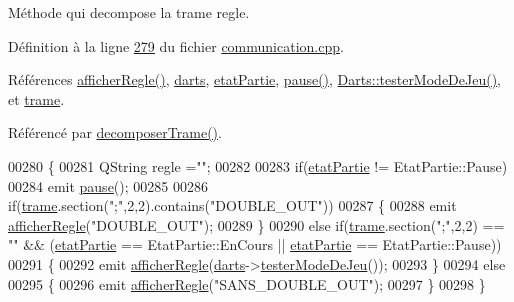 Méthode qui decompose la trame regle. 



Définition à la ligne \hyperlink{communication_8cpp_source_l00279}{279} du fichier \hyperlink{communication_8cpp_source}{communication.\+cpp}.



Références \hyperlink{class_communication_a4ee52f9b4a1a97967ab2c48a33e0e392}{afficher\+Regle()}, \hyperlink{communication_8h_source_l00093}{darts}, \hyperlink{communication_8h_source_l00100}{etat\+Partie}, \hyperlink{class_communication_a369c7aeadc5c5926eb701bdebe53972c}{pause()}, \hyperlink{darts_8cpp_source_l00506}{Darts\+::tester\+Mode\+De\+Jeu()}, et \hyperlink{communication_8h_source_l00099}{trame}.



Référencé par \hyperlink{communication_8cpp_source_l00188}{decomposer\+Trame()}.


\begin{DoxyCode}
00280 \{
00281     QString regle =\textcolor{stringliteral}{""};
00282 
00283     \textcolor{keywordflow}{if}(\hyperlink{class_communication_a2539ded2780db2c732690c585c768c96}{etatPartie} != EtatPartie::Pause)
00284         emit \hyperlink{class_communication_a369c7aeadc5c5926eb701bdebe53972c}{pause}();
00285 
00286     \textcolor{keywordflow}{if}(\hyperlink{class_communication_ac8f5004bfaaf7f538ba5ae93255f772b}{trame}.section(\textcolor{stringliteral}{";"},2,2).contains(\textcolor{stringliteral}{"DOUBLE\_OUT"}))
00287     \{
00288         emit \hyperlink{class_communication_a4ee52f9b4a1a97967ab2c48a33e0e392}{afficherRegle}(\textcolor{stringliteral}{"DOUBLE\_OUT"});
00289     \}
00290     \textcolor{keywordflow}{else} \textcolor{keywordflow}{if}(\hyperlink{class_communication_ac8f5004bfaaf7f538ba5ae93255f772b}{trame}.section(\textcolor{stringliteral}{";"},2,2) == \textcolor{stringliteral}{""} && (\hyperlink{class_communication_a2539ded2780db2c732690c585c768c96}{etatPartie} == EtatPartie::EnCours || 
      \hyperlink{class_communication_a2539ded2780db2c732690c585c768c96}{etatPartie} == EtatPartie::Pause))
00291     \{
00292         emit \hyperlink{class_communication_a4ee52f9b4a1a97967ab2c48a33e0e392}{afficherRegle}(\hyperlink{class_communication_a494d609c206472041468e362d7cfc0e5}{darts}->\hyperlink{class_darts_ad6535ce917119069ec099cea0e744971}{testerModeDeJeu}());
00293     \}
00294     \textcolor{keywordflow}{else}
00295     \{
00296         emit \hyperlink{class_communication_a4ee52f9b4a1a97967ab2c48a33e0e392}{afficherRegle}(\textcolor{stringliteral}{"SANS\_DOUBLE\_OUT"});
00297     \}
00298 \}
\end{DoxyCode}
\mbox{\label{class_communication_a31f998e3410e7a1d9e65a05a5d51a9b9}} 
